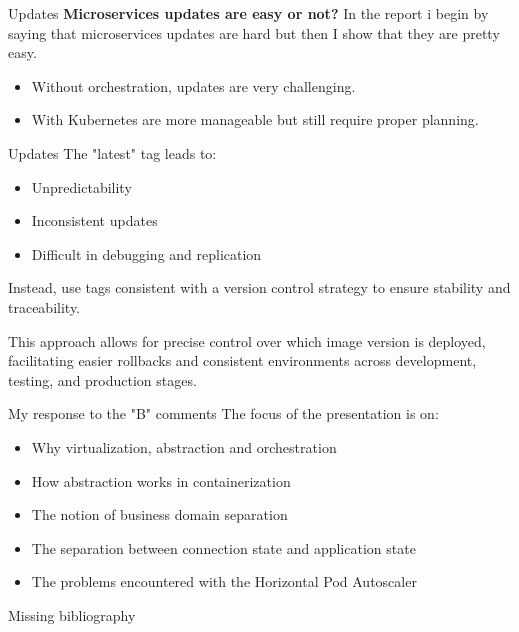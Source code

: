 \documentclass{beamer}
\begin{document}
\begin{frame}{Updates}
	\textbf{Microservices updates are easy or not?}
	In the report i begin by saying that microservices updates are hard but then I show that they are pretty easy.
	\begin{itemize}
		\item Without orchestration, updates are very challenging.
		\item With Kubernetes are more manageable but still require proper planning.
	\end{itemize}
\end{frame}
\begin{frame}{Updates}
	The "latest" tag leads to:
	\begin{itemize}
		\item Unpredictability
		\item Inconsistent updates
		\item Difficult in debugging and replication
	\end{itemize}
	\begin{block}{}
		Instead, use tags consistent with a version control strategy to ensure stability and traceability.
	\end{block}
	This approach allows for precise control over which image version is deployed, facilitating easier rollbacks and consistent environments across development, testing, and production stages.
\end{frame}



\begin{frame}{My response to the "B" comments}
		\label{index_2}
		The focus of the presentation is on:
			\begin{itemize}
				\item Why virtualization, abstraction and orchestration
				\item How abstraction works in containerization
				\item The notion of business domain separation
				\item The separation between connection state and application state
				\item The problems encountered with the Horizontal Pod Autoscaler
			\end{itemize}
\end{frame}

\begin{frame}{Missing bibliography}

\end{frame}
\end{document}
